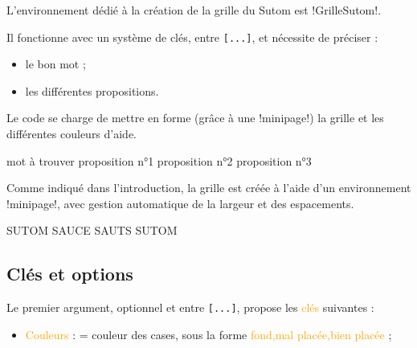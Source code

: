 \documentclass[french,a4paper,11pt]{article}
\newcommand\Cle[1]{{\small\sffamily\textlangle \textcolor{orange}{#1}\textrangle}}
\begin{document}
{\begin{cautionblock}
L'environnement dédié à la création de la grille du Sutom est \packagetex!GrilleSutom!.

Il fonctionne avec un système de clés, entre \texttt{[...]}, et nécessite de préciser :

\begin{itemize}
	\item le bon mot ;
	\item les différentes propositions.
\end{itemize}

Le code se charge de mettre en forme (grâce à une \motcletex!minipage!) la grille et les différentes couleurs d'aide.
\end{cautionblock}

\begin{DemoCode}
\begin{GrilleSutom}[clés]{mot à trouver}
	proposition n°1
	proposition n°2
	proposition n°3
\end{GrilleSutom}
\end{DemoCode}

\begin{noteblock}
Comme indiqué dans l'introduction, la grille est créée à l'aide d'un environnement \motcletex!minipage!, avec gestion automatique de la largeur et des espacements.
\end{noteblock}

\begin{DemoCode}[]
\begin{GrilleSutom}{SUTOM}
	SAUCE
	SAUTS
	SUTOM
\end{GrilleSutom}
\end{DemoCode}

\subsection{Clés et options}

\begin{tipblock}
Le premier argument, optionnel et entre \texttt{[...]}, propose les \Cle{clés} suivantes :

\begin{itemize}
	\item \Cle{Couleurs} : = couleur des cases, sous la forme \Cle{fond,mal placée,bien placée} ;


\end{itemize}
\end{tipblock}}
\end{document}
